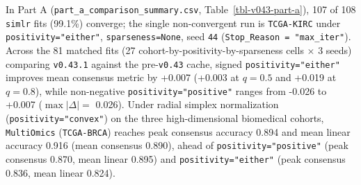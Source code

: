 \documentclass[
  10pt,
  letterpaper,
]{report}
\begin{document}
In Part A (\texttt{part\_a\_comparison\_summary.csv},
Table~\ref{tbl-v043-part-a}), 107 of 108 \texttt{simlr} fits (99.1\%)
converge; the single non-convergent run is \texttt{TCGA-KIRC} under
\texttt{positivity="either"}, \texttt{sparseness=None}, seed \texttt{44}
(\texttt{Stop\_Reason\ =\ "max\_iter"}). Across the 81 matched fits (27
cohort-by-positivity-by-sparseness cells \(\times\) 3 seeds) comparing
\texttt{v0.43.1} against the pre-\texttt{v0.43} cache, signed
\texttt{positivity="either"} improves mean consensus metric by +0.007
(+0.003 at \(q = 0.5\) and +0.019 at \(q = 0.8\)), while non-negative
\texttt{positivity="positive"} ranges from -0.026 to +0.007
(\(\max |\Delta| =\) 0.026). Under radial simplex normalization
(\texttt{positivity="convex"}) on the three high-dimensional biomedical
cohorts, \texttt{MultiOmics} (\texttt{TCGA-BRCA}) reaches peak consensus
accuracy 0.894 and mean linear accuracy 0.916 (mean consensus 0.890),
ahead of \texttt{positivity="positive"} (peak consensus 0.870, mean
linear 0.895) and \texttt{positivity="either"} (peak consensus 0.836,
mean linear 0.824).
\end{document}
